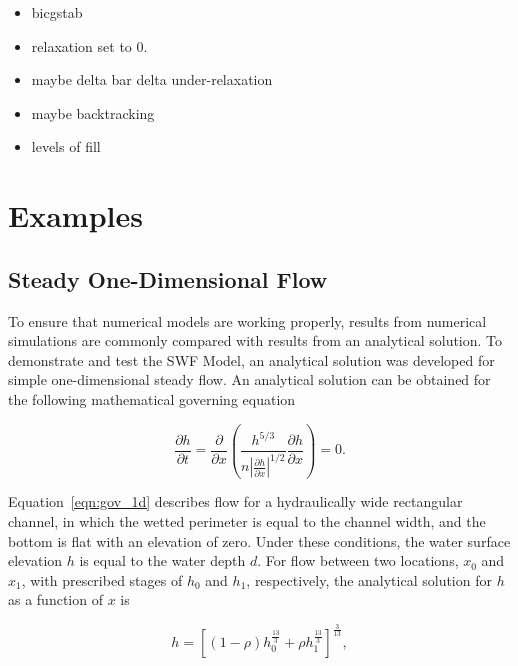 \documentclass[fleqn]{article}
\begin{document}
\begin{itemize}
  \item bicgstab
  \item relaxation set to 0.
  \item maybe delta bar delta under-relaxation
  \item maybe backtracking
  \item levels of fill
\end{itemize}


\newpage
\section{Examples}


\subsection{Steady One-Dimensional Flow}

To ensure that numerical models are working properly, results from numerical simulations are commonly compared with results from an analytical solution.  To demonstrate and test the SWF Model, an analytical solution was developed for simple one-dimensional steady flow.  An analytical solution can be obtained for the following mathematical governing equation

\begin{equation}
  \frac{\partial h}{\partial t} = \frac{\partial}{\partial x} 
  \left ( \frac{h^{5/3}}{n \left | \frac{\partial h}{\partial x} \right |^{1/2}} 
  \frac{\partial h}{\partial x} \right ) = 0 .
  \label{eqn:gov_1d}
\end{equation}

\noindent Equation~\ref{eqn:gov_1d} describes flow for a hydraulically wide rectangular channel, in which the wetted perimeter is equal to the channel width, and the bottom is flat with an elevation of zero.  Under these conditions, the water surface elevation $h$ is equal to the water depth $d$.  For flow between two locations, $x_0$ and $x_1$, with prescribed stages of $h_0$ and $h_1$, respectively, the analytical solution for $h$ as a function of $x$ is

\begin{equation}
  h = \left [ \left (1 - \rho \right ) h^{\frac{13}{3}}_{0} + \rho h^{\frac{13}{3}}_{1} \right ]^{\frac{3}{13}} ,
  \label{eqn:asoln_1d}
\end{equation}
\end{document}
